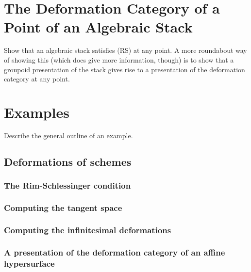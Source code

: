 \section{The Deformation Category of a Point of an Algebraic Stack} 
\label{section-algebraic-stacks}
\noindent
Show that an algebraic stack satisfies (RS) at any point.  A more roundabout 
way of showing this (which does give more information, though) is to show that 
a groupoid presentation of the stack gives rise to a presentation of the 
deformation category at any point.


\section{Examples}
\noindent
Describe the general outline of an example.
\label{section-examples}
\subsection{Deformations of schemes}
\subsubsection{The Rim-Schlessinger condition}
\subsubsection{Computing the tangent space}
\subsubsection{Computing the infinitesimal deformations}
\subsubsection{A presentation of the deformation category of an affine 
hypersurface}








